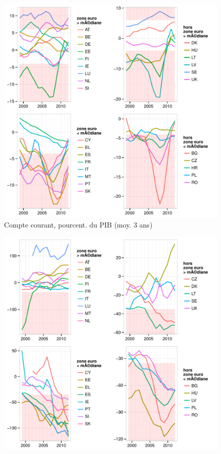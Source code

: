 \documentclass{article}\usepackage[]{graphicx}\usepackage[]{color}
\makeatletter
\def\maxwidth{ %
  \ifdim\Gin@nat@width>\linewidth
    \linewidth
  \else
    \Gin@nat@width
  \fi
}
\newenvironment{knitrout}{}{} %
\makeatother
\begin{document}
\begin{knitrout}
\color{fgcolor}\begin{figure}[p]


{\centering \includegraphics[width=\maxwidth]{figure_graph/byind1} 

}

\caption[Compte courant, pourcent]{Compte courant, pourcent. du PIB (moy. 3 ans)\label{fig:byind1}}
\end{figure}

\begin{figure}[p]


{\centering \includegraphics[width=\maxwidth]{figure_graph/byind2} 

}
\end{figure}
\end{knitrout}
\end{document}
